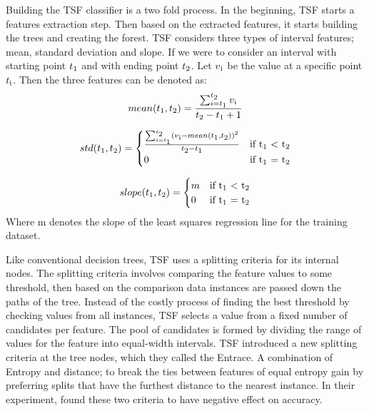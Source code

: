 Building the TSF classifier is a two fold process. In the beginning, TSF starts a features extraction step.
Then based on the extracted features, it starts building the trees and creating the forest.
TSF considers three types of interval features; mean, standard deviation and slope.
If we were to consider an interval with starting point $t\textsubscript{1}$ and with ending point $t\textsubscript{2}$.
Let $v\textsubscript{i}$ be the value at a specific point $t\textsubscript{i}$.
Then the three features can be denoted as:
\begin{equation}
    mean(t\textsubscript{1},t\textsubscript{2})= \frac{\sum_{i=t\textsubscript{1}}^{t\textsubscript{2}} v\textsubscript{i}}{t\textsubscript{2} - t\textsubscript{1} + 1}
\end{equation}

\begin{equation}
    std(t\textsubscript{1},t\textsubscript{2})=
        \begin{cases}
        \frac{\sum_{i=t\textsubscript{1}}^{t\textsubscript{2}} (v\textsubscript{i} - mean(t\textsubscript{1},t\textsubscript{2}))^{2}}
            {t\textsubscript{2} - t\textsubscript{1}}
            & \text{if t\textsubscript{1} $<$ t\textsubscript{2}}\\
        0 & \text{if t\textsubscript{1} = t\textsubscript{2}}
        \end{cases}
\end{equation}

\begin{equation}
    slope(t\textsubscript{1},t\textsubscript{2})=
        \begin{cases}
        m & \text{if t\textsubscript{1} $<$ t\textsubscript{2}}\\
        0 & \text{if t\textsubscript{1} = t\textsubscript{2}}
        \end{cases}
\end{equation}
Where m denotes the slope of the least squares regression line for the training dataset.

Like conventional decision trees, TSF uses a splitting criteria for its internal nodes.
The splitting criteria involves comparing the feature values to some threshold, then based on the comparison data instances are passed down the paths of the tree.
Instead of the costly process of finding the best threshold by checking values from all instances, TSF selects a value from a fixed number of candidates per feature.
The pool of candidates is formed by dividing the range of values for the feature into equal-width intervals.
TSF introduced a new splitting criteria at the tree nodes, which they called the Entrace. A combination of Entropy and distance; to break the ties between features of equal entropy gain by preferring splits that have the furthest distance to the nearest instance.
In their experiment, \cite{bagnall2017great} found these two criteria to have negative effect on accuracy.

